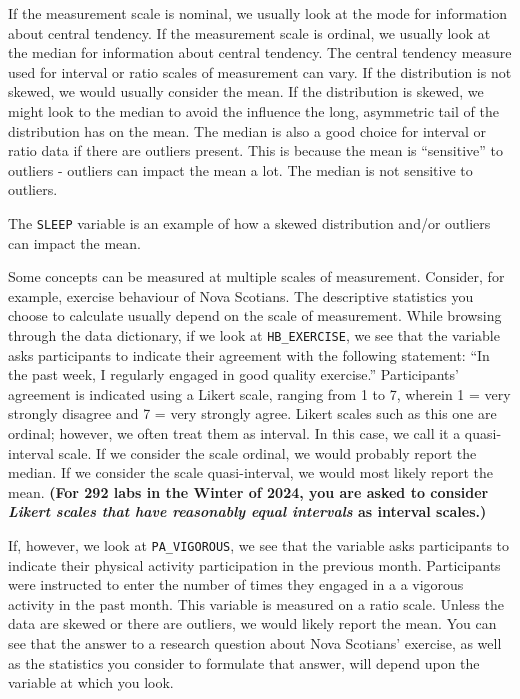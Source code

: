 \documentclass[
]{book}
\begin{document}
If the measurement scale is nominal, we usually look at the mode for information about central tendency. If the measurement scale is ordinal, we usually look at the median for information about central tendency. The central tendency measure used for interval or ratio scales of measurement can vary. If the distribution is not skewed, we would usually consider the mean. If the distribution is skewed, we might look to the median to avoid the influence the long, asymmetric tail of the distribution has on the mean. The median is also a good choice for interval or ratio data if there are outliers present. This is because the mean is ``sensitive'' to outliers - outliers can impact the mean a lot. The median is not sensitive to outliers.

The \texttt{SLEEP} variable is an example of how a skewed distribution and/or outliers can impact the mean.

Some concepts can be measured at multiple scales of measurement. Consider, for example, exercise behaviour of Nova Scotians. The descriptive statistics you choose to calculate usually depend on the scale of measurement. While browsing through the data dictionary, if we look at \texttt{HB\_EXERCISE}, we see that the variable asks participants to indicate their agreement with the following statement: ``In the past week, I regularly engaged in good quality exercise.'' Participants' agreement is indicated using a Likert scale, ranging from 1 to 7, wherein 1 = very strongly disagree and 7 = very strongly agree. Likert scales such as this one are ordinal; however, we often treat them as interval. In this case, we call it a quasi-interval scale. If we consider the scale ordinal, we would probably report the median. If we consider the scale quasi-interval, we would most likely report the mean. \textbf{(For 292 labs in the Winter of 2024, you are asked to consider \emph{Likert scales that have reasonably equal intervals} as interval scales.)}

If, however, we look at \texttt{PA\_VIGOROUS}, we see that the variable asks participants to indicate their physical activity participation in the previous month. Participants were instructed to enter the number of times they engaged in a a vigorous activity in the past month. This variable is measured on a ratio scale. Unless the data are skewed or there are outliers, we would likely report the mean. You can see that the answer to a research question about Nova Scotians' exercise, as well as the statistics you consider to formulate that answer, will depend upon the variable at which you look.
\end{document}
